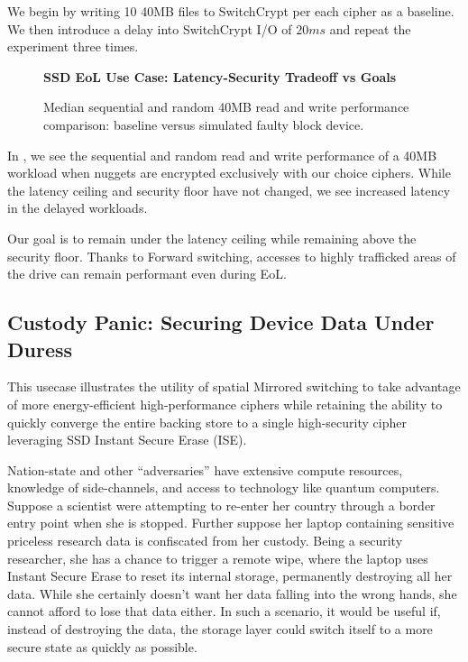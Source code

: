 We begin by writing 10 40MB files to SwitchCrypt per each cipher as a baseline.
We then introduce a delay into SwitchCrypt I/O of $20ms$ and repeat the
experiment three times.

\begin{figure}[ht] \textbf{SSD EoL Use Case: Latency-Security Tradeoff vs
   Goals}\par\medskip
   {} \caption{Median sequential and
   random 40MB read and write performance comparison: baseline versus simulated
   faulty block device.}
  \label{fig:usecase-eol-tradeoff}
\end{figure}

In , we see the sequential and random read and
write performance of a 40MB workload when nuggets are encrypted exclusively with
our choice ciphers. While the latency ceiling and security floor have not
changed, we see increased latency in the delayed workloads.

Our goal is to remain under the latency ceiling while remaining above the
security floor. Thanks to Forward switching, accesses to highly trafficked areas
of the drive can remain performant even during EoL.

\subsection{Custody Panic: Securing Device Data Under Duress}

This usecase illustrates the utility of spatial Mirrored switching to take
advantage of more energy-efficient high-performance ciphers while retaining the
ability to quickly converge the entire backing store to a single high-security
cipher leveraging SSD Instant Secure Erase (ISE).

Nation-state and other ``adversaries'' have extensive compute resources,
knowledge of side-channels, and access to technology like quantum computers.
Suppose a scientist were attempting to re-enter her country through a border
entry point when she is stopped. Further suppose her laptop containing sensitive
priceless research data is confiscated from her custody. Being a security
researcher, she has a chance to trigger a remote wipe, where the laptop uses
Instant Secure Erase to reset its internal storage, permanently destroying all
her data. While she certainly doesn't want her data falling into the wrong
hands, she cannot afford to lose that data either. In such a scenario, it would
be useful if, instead of destroying the data, the storage layer could switch
itself to a more secure state as quickly as possible.

